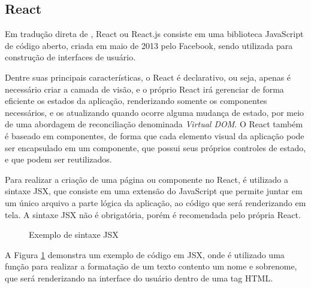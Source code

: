 \subsection{React}

Em tradução direta de \citep[p. 30]{Thakkar:2020}, React ou React.js consiste em uma
biblioteca JavaScript de código aberto, criada em maio de 2013 pelo Facebook,
sendo utilizada para construção de interfaces de usuário.

Dentre suas principais características, o React é declarativo, ou seja,
apenas é necessário criar a camada de visão, e o próprio React irá gerenciar
de forma eficiente os estados da aplicação, renderizando somente os componentes
necessários, e os atualizando quando ocorre alguma mudança de estado, por meio
de uma abordagem de reconciliação denominada \emph{Virtual DOM}. O React
também é baseado em componentes, de forma que cada elemento visual da aplicação
pode ser encapsulado em um componente, que possui seus próprios controles de estado,
e que podem ser reutilizados.

Para realizar a criação de uma página ou componente no React, é utilizado a
sintaxe JSX, que consiste em uma extensão do JavaScript que permite juntar
em um único arquivo a parte lógica da aplicação, ao código que será renderizando em
tela. A sintaxe JSX não é obrigatória, porém é recomendada pelo própria React.

\begin{figure}[H]
    \caption{Exemplo de sintaxe JSX}
    \centering
    \label{fig:exemple-jsx}
\end{figure}

A Figura \ref{fig:exemple-jsx} demonstra um exemplo de código em JSX, onde é
utilizado uma função para realizar a formatação de um texto contento um
nome e sobrenome, que será renderizando na interface do usuário dentro de uma
tag HTML.

